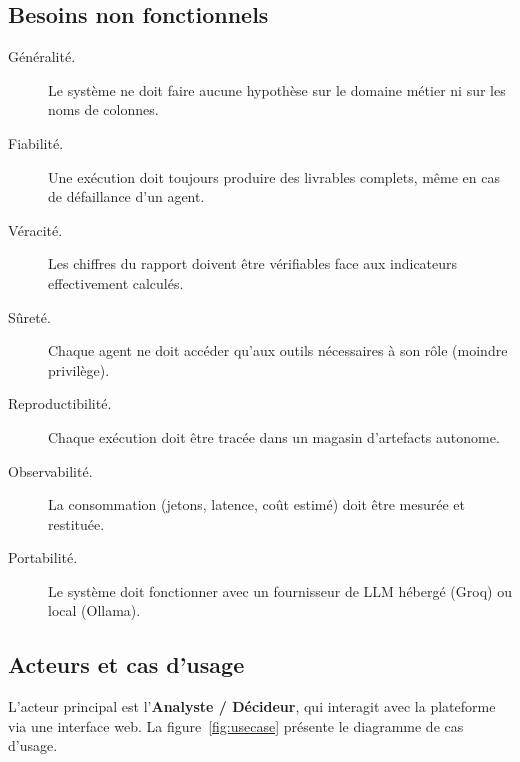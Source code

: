 \subsection{Besoins non fonctionnels}
\begin{description}
  \item[Généralité.] Le système ne doit faire aucune hypothèse sur le domaine
    métier ni sur les noms de colonnes.
  \item[Fiabilité.] Une exécution doit toujours produire des livrables
    complets, même en cas de défaillance d'un agent.
  \item[Véracité.] Les chiffres du rapport doivent être vérifiables face aux
    indicateurs effectivement calculés.
  \item[Sûreté.] Chaque agent ne doit accéder qu'aux outils nécessaires à son
    rôle (moindre privilège).
  \item[Reproductibilité.] Chaque exécution doit être tracée dans un magasin
    d'artefacts autonome.
  \item[Observabilité.] La consommation (jetons, latence, coût estimé) doit
    être mesurée et restituée.
  \item[Portabilité.] Le système doit fonctionner avec un fournisseur de LLM
    hébergé (Groq) ou local (Ollama).
\end{description}

\subsection{Acteurs et cas d'usage}
L'acteur principal est l'\textbf{Analyste / Décideur}, qui interagit avec la
plateforme via une interface web. La figure~\ref{fig:usecase} présente le
diagramme de cas d'usage.

